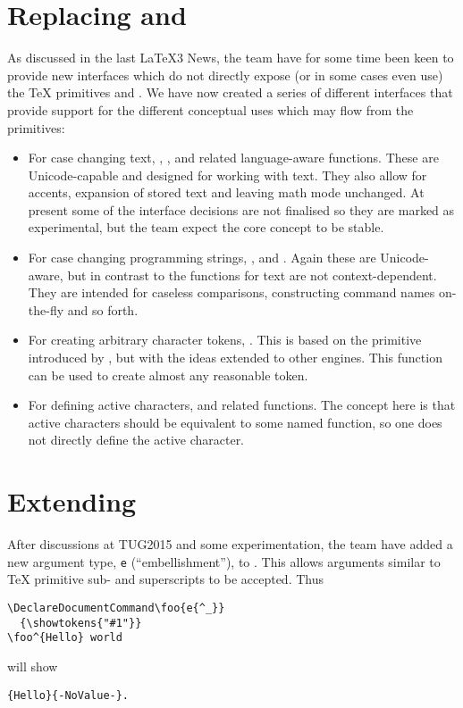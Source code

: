 \documentclass{ltnews}
\begin{document}
\section{Replacing  and }

As discussed in the last \LaTeX3 News, the team have for some time been keen to
provide new interfaces which do not directly expose (or in some cases even use)
the \TeX{} primitives  and . We have now created a
series of different interfaces that provide support for the different
conceptual uses which may flow from the primitives:
\begin{itemize}
  \item For case changing text, , ,
     and related language-aware functions. These are
    Unicode-capable and designed for working with text. They also allow for
    accents, expansion of stored text and leaving math mode unchanged.  At
    present some of the interface decisions are not finalised so they are
    marked as experimental, but the team expect the core concept to be stable.
  \item For case changing programming strings, ,
     and . Again these are
    Unicode-aware, but in contrast to the functions for text are not
    context-dependent. They are intended for caseless comparisons, constructing
    command names on-the-fly and so forth.
  \item For creating arbitrary character tokens, . This
    is based on the  primitive introduced by , but
    with the ideas extended to other engines. This function can be used to
    create almost any reasonable token.
  \item For defining active characters,  and
    related functions. The concept here is that active characters should be
    equivalent to some named function, so one does not directly define the
    active character.
\end{itemize}

\section{Extending }

After discussions at TUG2015 and some experimentation, the team have added a
new argument type, \texttt{e} (\enquote{embellishment}), to .
This allows arguments similar to
\TeX{} primitive sub- and superscripts to be accepted. Thus
\begin{verbatim}
\DeclareDocumentCommand\foo{e{^_}}
  {\showtokens{"#1"}}
\foo^{Hello} world
\end{verbatim}
will show
\begin{verbatim}
{Hello}{-NoValue-}.
\end{verbatim}
\end{document}
